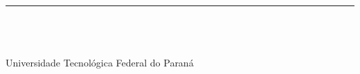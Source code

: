 \begin{folhadeaprovacao}
    \vspace*{20pt}

    \begin{center}
        \rule{10cm}{0.4pt}\\[4pt]
        \underline{\hspace{6cm}}\\
        \underline{\hspace{3cm}}\\
        Universidade Tecnológica Federal do Paraná
    \end{center}

    \vfill

    \begin{center}
        \begin{SingleSpacing}
            \large\bfseries\MakeUppercase{\imprimirlocal}\\
            \large\bfseries\MakeUppercase{\imprimirdata}
        \end{SingleSpacing}
    \end{center}

\end{folhadeaprovacao}
